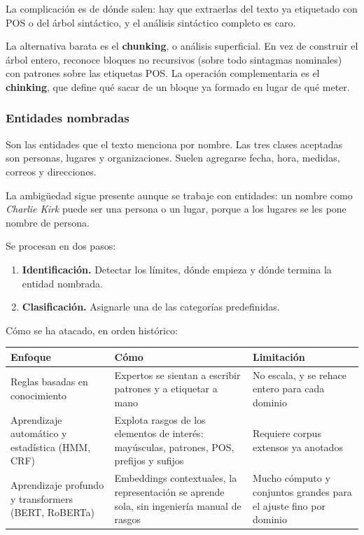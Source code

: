 \documentclass[11pt,letterpaper]{article}
\begin{document}
La complicación es de dónde salen: hay que extraerlas del texto ya
etiquetado con POS o del árbol sintáctico, y el análisis sintáctico
completo es caro.

La alternativa barata es el \textbf{chunking}, o análisis superficial.
En vez de construir el árbol entero, reconoce bloques no recursivos
(sobre todo sintagmas nominales) con patrones sobre las etiquetas POS.
La operación complementaria es el \textbf{chinking}, que define qué
sacar de un bloque ya formado en lugar de qué meter.

\subsubsection*{Entidades nombradas}

Son las entidades que el texto menciona por nombre. Las tres clases
aceptadas son personas, lugares y organizaciones. Suelen agregarse
fecha, hora, medidas, correos y direcciones.

La ambigüedad sigue presente aunque se trabaje con entidades: un
nombre como \textit{Charlie Kirk} puede ser una persona o un lugar,
porque a los lugares se les pone nombre de persona.

Se procesan en dos pasos:

\begin{enumerate}[itemsep=0.2em]
    \item \textbf{Identificación.} Detectar los límites, dónde empieza
          y dónde termina la entidad nombrada.
    \item \textbf{Clasificación.} Asignarle una de las categorías
          predefinidas.
\end{enumerate}

Cómo se ha atacado, en orden histórico:

\begin{center}
\begin{tabular}{>{\raggedright\arraybackslash}p{3.1cm}
                >{\raggedright\arraybackslash}p{5.1cm}
                >{\raggedright\arraybackslash}p{5.1cm}}
    \toprule
    \textbf{Enfoque} & \textbf{Cómo} & \textbf{Limitación} \\
    \midrule
    Reglas basadas en conocimiento &
    Expertos se sientan a escribir patrones y a etiquetar a mano &
    No escala, y se rehace entero para cada dominio \\
    \addlinespace
    Aprendizaje automático y estadística (HMM, CRF) &
    Explota rasgos de los elementos de interés: mayúsculas, patrones,
    POS, prefijos y sufijos &
    Requiere corpus extensos ya anotados \\
    \addlinespace
    Aprendizaje profundo y transformers (BERT, RoBERTa) &
    Embeddings contextuales, la representación se aprende sola, sin
    ingeniería manual de rasgos &
    Mucho cómputo y conjuntos grandes para el ajuste fino por
    dominio \\
    \bottomrule
\end{tabular}
\end{center}
\end{document}
